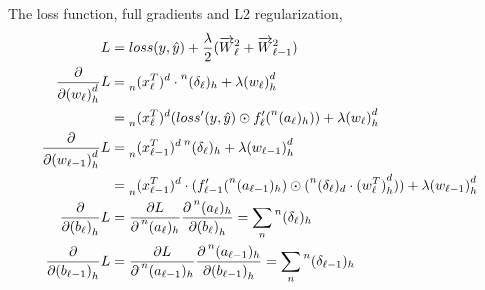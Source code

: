 \documentclass[12pt,a4paper]{article}%
\theoremstyle{definition}
\theoremstyle{plain}
\numberwithin{equation}{section}
\begin{document}
The loss function, full gradients and L2 regularization, 
\begin{align*}
 L &= loss({y}, {\hat{y}}) + \frac{\lambda}{2} ( \overrightarrow{W}_\ell^2 + \overrightarrow{W}_{\ell-1}^2 ) \\
\frac{\partial}{\partial {(w_{\ell})}^{d}_{h}} L &= \prescript{}{n}{(x_{\ell}^{T})}^{d} \cdot \prescript{n}{}{(\delta_{\ell})}_{h} + \lambda {(w_{\ell})}^{d}_{h} \\
																				  &= \prescript{}{n}{(x_{\ell}^{T})}^{d} (loss'(y,\hat{y}) \odot f'_{\ell}(\prescript{n}{}{(a_{\ell})}_{h})) + \lambda {(w_{\ell})}^{d}_{h} \\
\frac{\partial}{\partial {(w_{\ell-1})}^{d}_{h}} L &= \prescript{}{n}{(x_{\ell-1}^{T})}^{d} \prescript{n}{}{(\delta_{\ell})}_{h} + \lambda {(w_{\ell-1})}^{d}_{h} \\
																					 &= \prescript{}{n}{(x_{\ell-1}^{T})}^{d} \cdot  (f'_{\ell-1}(\prescript{n}{}{(a_{\ell-1})}_{h}) \odot (\prescript{n}{}{(\delta_{\ell})}_{d} \cdot {(w_{\ell}^{T})}^{d}_{h})) + \lambda {(w_{\ell-1})}^{d}_{h} \\
\frac{\partial}{\partial {(b_{\ell})}_{h}} L  &= \frac{\partial L}{\partial \prescript{n}{}{(a_{\ell})}_{h}} \frac{\partial \prescript{n}{}{(a_{\ell})}_{h}}{\partial {(b_{\ell})}_{h}} = \sum\limits_{n} \prescript{n}{}{(\delta_{\ell})}_{h} \\
\frac{\partial}{\partial {(b_{\ell-1})}_{h}} L  &= \frac{\partial L}{\partial \prescript{n}{}{(a_{\ell-1})}_{h}} \frac{\partial \prescript{n}{}{(a_{\ell-1})}_{h}}{\partial {(b_{\ell-1})}_{h}} = \sum\limits_{n} \prescript{n}{}{(\delta_{\ell-1})}_{h}
\end{align*} 
\end{document}
